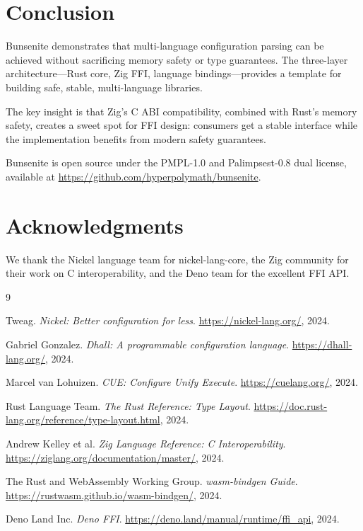 \documentclass[11pt,a4paper]{article}
\begin{document}
\section{Conclusion}

Bunsenite demonstrates that multi-language configuration parsing can be achieved without sacrificing memory safety or type guarantees. The three-layer architecture---Rust core, Zig FFI, language bindings---provides a template for building safe, stable, multi-language libraries.

The key insight is that Zig's C ABI compatibility, combined with Rust's memory safety, creates a sweet spot for FFI design: consumers get a stable interface while the implementation benefits from modern safety guarantees.

Bunsenite is open source under the PMPL-1.0 and Palimpsest-0.8 dual license, available at \url{https://github.com/hyperpolymath/bunsenite}.

\section*{Acknowledgments}

We thank the Nickel language team for nickel-lang-core, the Zig community for their work on C interoperability, and the Deno team for the excellent FFI API.


\begin{thebibliography}{9}

Tweag. \textit{Nickel: Better configuration for less}. \url{https://nickel-lang.org/}, 2024.

Gabriel Gonzalez. \textit{Dhall: A programmable configuration language}. \url{https://dhall-lang.org/}, 2024.

Marcel van Lohuizen. \textit{CUE: Configure Unify Execute}. \url{https://cuelang.org/}, 2024.

Rust Language Team. \textit{The Rust Reference: Type Layout}. \url{https://doc.rust-lang.org/reference/type-layout.html}, 2024.

Andrew Kelley et al. \textit{Zig Language Reference: C Interoperability}. \url{https://ziglang.org/documentation/master/}, 2024.

The Rust and WebAssembly Working Group. \textit{wasm-bindgen Guide}. \url{https://rustwasm.github.io/wasm-bindgen/}, 2024.

Deno Land Inc. \textit{Deno FFI}. \url{https://deno.land/manual/runtime/ffi_api}, 2024.

\end{thebibliography}
\end{document}
